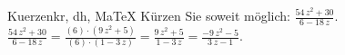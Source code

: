\begin{MAufgabe}{Kuerzen}{kr, dh, MaTeX}
K\"urzen Sie soweit m\"oglich: $\frac{54\, z^2 + 30}{6 - 18\, z}$.\\ 
\ifLsg\MLoesung
\quad $\frac{54\, z^2 + 30}{6 - 18\, z}=\frac{(6)\cdot(9\, z^2 + 5)}{(6)\cdot(1 - 3\, z)}=\frac{9\, z^2 + 5}{1 - 3\, z}=\frac{ - 9\, z^2 - 5}{3\, z - 1}$.\else\relax\fi
 \end{MAufgabe}